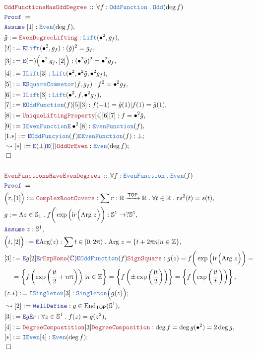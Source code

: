 \documentclass[12pt]{scrartcl}
\newcommand{\TYPE}[1]{\textcolor{NavyBlue}{\mathtt{#1}}}
\newcommand{\LOGIC}[1]{\textcolor{Blue}{\mathtt{#1}}}
\newcommand{\THM}[1]{\textcolor{Maroon}{\mathtt{#1}}}
\renewcommand{\.}{\; . \;}
\newcommand{\de}{: \kern 0.1pc =}
\newcommand{\Theorem}[2]{& \THM{#1} \, :: \, #2 \\ & \Proof = \\ }
\newcommand{\NewLine}{\\ & \kern 1pc}
\newcommand{\Page}[1]{ \begin{align*} #1 \end{align*}   }
\newcommand{\Intro}{\LOGIC{I}}
\newcommand{\Elim}{\LOGIC{E}}
\newcommand{\Int}{\mathbb{Z} }
\newcommand{\Reals}{\mathbb{R} }
\newcommand{\Complex}{\mathbb{C}}
\newcommand{\Sphere}{\mathbb{S}}
\newcommand{\End}{\mathrm{End}}
\newcommand{\Arrow}{\xrightarrow}
\newcommand{\Say}[3]{& #1 \de #2 : #3, \\}
\newcommand{\Conclude}[3]{& #1 \de #2 : #3; \\}
\newcommand{\Derive}[3]{& \leadsto #1 \de #2 : #3, \\}
\newcommand{\DeriveConclude}[3]{& \leadsto #1 \de #2 : #3 ; \\}
\newcommand{\Assume}[2]{& \LOGIC{Assume} \; #1 : #2, \\}
\newcommand{\QED}{\; \square}
\newcommand{\EndProof}{& \QED \\}
\newcommand{\Proof}{\LOGIC{Proof} \; }
\newcommand{\TOP}{\mathsf{TOP}}
\begin{document}
\Page{
	\Theorem{OddFunctionsHasOddDegree}
	{
		\forall f : \TYPE{OddFunction} \.
		\TYPE{Odd}(\deg f)
	}
	\Assume{[1]}{\TYPE{Even}(\deg f)}
	\Say{\tilde g}{\THM{EvenDegreeLifting}}
	{
		\TYPE{Lift}(\bullet^2,g_f)
	}
	\Say{[2]}{\Elim \TYPE{Lift}(\bullet^2,g_f)}
	{
		(\tilde g)^2 = g_f
	}
	\Say{[3]}{ \Elim(=)\Big( \bullet^2 g_f, [2] \Big)}
	{
		(\bullet^2 \tilde g)^2 = \bullet^2 g_f
	}
	\Say{[4]}{\Intro \TYPE{Lift}[3]}
	{
		\TYPE{Lift}(\bullet^2, \bullet^2 \tilde g, \bullet^2 g_f)
	}
	\Say{[5]}{\Elim \TYPE{SquareCommetor}(f,g_f)}
	{
		f^2 = \bullet^2 g_f
	}
	\Say{[6]}{\Intro \TYPE{Lift}[3]}
	{
		\TYPE{Lift}(\bullet^2, f, \bullet^2 g_f)
	}
	\Say{[7]}{\Elim \TYPE{OddFunction}(f)[5][3]}{f(-1) = \tilde g(1) | f(1) = \tilde g(1)}
	\Say{[8]}{\THM{UniqueLiftingProperty}[4][6][7]}{f = \bullet^2 \tilde g}
	\Say{[9]}{\Intro \TYPE{EvenFunction} \Elim \bullet^2 [8]}{\TYPE{EvenFunction}(f)}
	\Conclude{[1.*]}{\Elim \TYPE{OddFuncyion}(f) \Elim \TYPE{EvenFunction}(f)}{\bot}
	\DeriveConclude{[*]}{\Elim(\bot)\Elim (|) \THM{OddOrEven}}{\TYPE{Even}(\deg f)}
	\EndProof
	\\
	\Theorem{EvenFunctionsHaveEvenDegrees}
	{
		\forall f : \TYPE{EvenFunction} \.
		\TYPE{Even}(f)
	}
	\Say{ \Big( r, [1]\Big)  }{ \THM{ComplexRootCovers} }
	{
		\sum r : \Reals \Arrow{\TOP} \Reals \. 
		\forall t \in \Reals \. 
		rs^2(t)   = s(t)
	}
	\Say{g}{\Lambda z \in \Sphere_1 \. f\bigg(\exp\Big(\mathrm{i}r\Big( \mathrm{Arg}\; z\Big) \bigg) }
	{
		\Sphere^1 \to ?\Sphere^1
	}
	\Assume{z}{\Sphere^1}
	\Say{\Big( t,[2] \Big)}{\Elim \mathrm{Arg}(z)}
	{ \sum t \in [0, 2\uppi) \. \mathrm{Arg}\;z = \{ t + 2\uppi n | n \in \Int \} }
	\Say{[3]}
	{
		\Elim g 
		[2] \Elim r 
		\THM{ExpHomo}(\Complex)
		\Elim \TYPE{OddFunction}(f)
		\THM{SignSquare}
	}
	{
		g(z) = 	
		f\bigg(\exp\Big(\mathrm{i}r\Big( \mathrm{Arg}\; z\Big) \bigg) = \NewLine = 
		\left\{ f\left(\exp\left( \frac{\mathrm{i}t}{2} + n \uppi \right)\right)  |n \in \Int\right\} =
		\left\{ f\left(\pm\exp\left( \frac{\mathrm{i}t}{2}  \right)\right)  \right\}  =
		\left\{ f\left(\exp\left( \frac{\mathrm{i}t}{t} \right) \right) \right\}
	}
	\Conclude{(z.*)}{\Intro \TYPE{Singleton}[3]}{\TYPE{Singleton}\Big(g(z)\Big)}
	\Derive{[2]}{\LOGIC{WellDefine}}{g \in \End_{\TOP}(\Sphere^1)}
	\Say{[3]}{\Elim g \Elim r}{ \forall z \in \Sphere^1 \.  f(z) =  g(z^2)  } 
	\Say{[4]}{\THM{DegreeCompostition}[3]\THM{DegreeComposition}}
	{
		\deg f  = \deg g(\bullet^2) = 2 \deg g
	}
	\Conclude{[*]}{\Intro \TYPE{Even}[4]}
	{
		\TYPE{Even}( \deg f )
	}
	\EndProof
}
\end{document}
